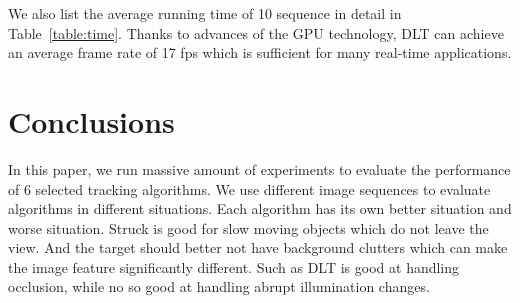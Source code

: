 \documentclass{acm_proc_article-sp}
\begin{document}
We also list the average running time of 10 sequence in detail in Table~\ref{table:time}. Thanks to advances of the GPU technology, DLT can achieve an average frame rate of 17 fps which is sufficient for many real-time applications.


\section{Conclusions}
In this paper, we run massive amount of experiments to evaluate the performance of 6 selected tracking algorithms.
We use different image sequences to evaluate algorithms in different situations.
Each algorithm has its own better situation and worse situation.
Struck is good for slow moving objects which do not leave the view. And the target should better not have background clutters which can make the image feature significantly different.
Such as DLT is good at handling occlusion, while no so good at handling abrupt illumination changes.
\end{document}

